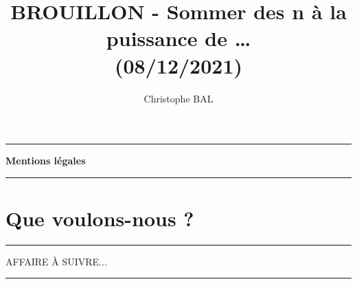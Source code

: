 \documentclass[12pt]{amsart}
\begin{document}
\title{BROUILLON - Sommer des n à la puissance de \dots \\{\small(08/12/2021)}}

\author{Christophe BAL}

\maketitle



\begin{center}
	\hrule\vspace{.3em}
	{
		\fontsize{1.35em}{1em}\selectfont
		\textbf{Mentions \og légales \fg}
	}
			
	\vspace{0.45em}
	\doclicenseThis
	\hrule
\end{center}




\setcounter{tocdepth}{1}
\tableofcontents




\newpage
\section{Que voulons-nous ?}






\bigskip

\hrule

\bigskip
{\Huge AFFAIRE À SUIVRE...}
\bigskip

\bigskip

\hrule
\end{document}
